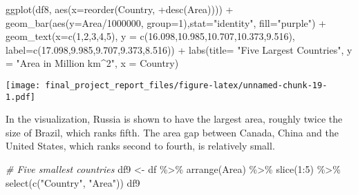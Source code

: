 \documentclass[
]{article}
\newenvironment{Shaded}{\begin{snugshade}}{\end{snugshade}}
\newcommand{\AttributeTok}[1]{\textcolor[rgb]{0.77,0.63,0.00}{#1}}
\newcommand{\CommentTok}[1]{\textcolor[rgb]{0.56,0.35,0.01}{\textit{#1}}}
\newcommand{\DecValTok}[1]{\textcolor[rgb]{0.00,0.00,0.81}{#1}}
\newcommand{\FloatTok}[1]{\textcolor[rgb]{0.00,0.00,0.81}{#1}}
\newcommand{\FunctionTok}[1]{\textcolor[rgb]{0.00,0.00,0.00}{#1}}
\newcommand{\NormalTok}[1]{#1}
\newcommand{\OtherTok}[1]{\textcolor[rgb]{0.56,0.35,0.01}{#1}}
\newcommand{\SpecialCharTok}[1]{\textcolor[rgb]{0.00,0.00,0.00}{#1}}
\newcommand{\StringTok}[1]{\textcolor[rgb]{0.31,0.60,0.02}{#1}}
\begin{document}
\begin{Shaded}
\begin{Highlighting}[]
\FunctionTok{ggplot}\NormalTok{(df8, }\FunctionTok{aes}\NormalTok{(}\AttributeTok{x=}\FunctionTok{reorder}\NormalTok{(Country, }\SpecialCharTok{+}\FunctionTok{desc}\NormalTok{(Area))))  }\SpecialCharTok{+} 
  \FunctionTok{geom\_bar}\NormalTok{(}\FunctionTok{aes}\NormalTok{(}\AttributeTok{y=}\NormalTok{Area}\SpecialCharTok{/}\DecValTok{1000000}\NormalTok{, }\AttributeTok{group=}\DecValTok{1}\NormalTok{),}\AttributeTok{stat=}\StringTok{"identity"}\NormalTok{, }\AttributeTok{fill=}\StringTok{"purple"}\NormalTok{) }\SpecialCharTok{+}
  \FunctionTok{geom\_text}\NormalTok{(}\AttributeTok{x=}\FunctionTok{c}\NormalTok{(}\DecValTok{1}\NormalTok{,}\DecValTok{2}\NormalTok{,}\DecValTok{3}\NormalTok{,}\DecValTok{4}\NormalTok{,}\DecValTok{5}\NormalTok{), }\AttributeTok{y =} \FunctionTok{c}\NormalTok{(}\FloatTok{16.098}\NormalTok{,}\FloatTok{10.985}\NormalTok{,}\FloatTok{10.707}\NormalTok{,}\FloatTok{10.373}\NormalTok{,}\FloatTok{9.516}\NormalTok{), }\AttributeTok{label=}\FunctionTok{c}\NormalTok{(}\FloatTok{17.098}\NormalTok{,}\FloatTok{9.985}\NormalTok{,}\FloatTok{9.707}\NormalTok{,}\FloatTok{9.373}\NormalTok{,}\FloatTok{8.516}\NormalTok{)) }\SpecialCharTok{+}
  \FunctionTok{labs}\NormalTok{(}\AttributeTok{title=} \StringTok{"Five Largest Countries"}\NormalTok{, }\AttributeTok{y =} \StringTok{"Area in Million km\^{}2"}\NormalTok{, }
        \AttributeTok{x =} \StringTok{\textquotesingle{}Country\textquotesingle{}}\NormalTok{)}
\end{Highlighting}
\end{Shaded}

\texttt{[image: final\_project\_report\_files/figure-latex/unnamed-chunk-19-1.pdf]}

In the visualization, Russia is shown to have the largest area, roughly
twice the size of Brazil, which ranks fifth. The area gap between
Canada, China and the United States, which ranks second to fourth, is
relatively small.

\begin{Shaded}
\begin{Highlighting}[]
\CommentTok{\# Five smallest countries}
\NormalTok{df9 }\OtherTok{\textless{}{-}}\NormalTok{ df }\SpecialCharTok{\%\textgreater{}\%} \FunctionTok{arrange}\NormalTok{(Area) }\SpecialCharTok{\%\textgreater{}\%} \FunctionTok{slice}\NormalTok{(}\DecValTok{1}\SpecialCharTok{:}\DecValTok{5}\NormalTok{) }\SpecialCharTok{\%\textgreater{}\%} \FunctionTok{select}\NormalTok{(}\FunctionTok{c}\NormalTok{(}\StringTok{"Country"}\NormalTok{, }\StringTok{"Area"}\NormalTok{))}
\NormalTok{df9}
\end{Highlighting}
\end{Shaded}
\end{document}
